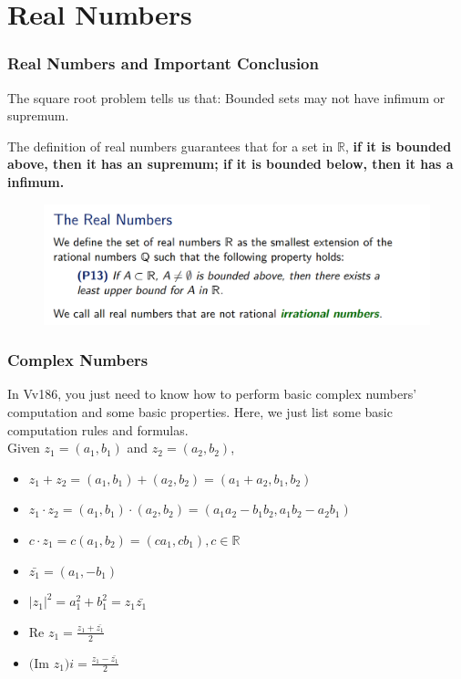 \documentclass{beamer}
\begin{document}
\section{Real Numbers}
\begin{frame}
    \frametitle{Real Numbers and Important Conclusion}
    The square root problem tells us that: Bounded sets may not have infimum or supremum.

    The definition of real numbers guarantees that for a set in $\mathbb{R}$, \textbf{if it is bounded above, then it has an supremum;
        if it is bounded below, then it has a infimum.}

    \begin{figure}[htbp]
        \centering
        \includegraphics[width=12cm]{definition.png}
    \end{figure}
\end{frame}


\begin{frame}
    \frametitle{Complex Numbers}
    \hspace{1em}
    In Vv186, you just need to know how to perform basic complex numbers' computation
    and some basic properties.
    Here, we just list some basic computation rules and formulas.\\
    Given $z_1=(a_1,b_1)$ and $z_2=(a_2,b_2)$,
    \begin{itemize}
        \item $z_1+z_2=(a_1,b_1)+(a_2,b_2)=(a_1+a_2,b_1,b_2)$
        \item $z_1\cdot z_2=(a_1,b_1)\cdot (a_2,b_2)=(a_1a_2-b_1b_2,a_1b_2-a_2b_1)$
        \item $c\cdot z_1=c(a_1,b_2)=(ca_1,cb_1), c\in \mathbb{R} $
        \item $\bar{z_1}=(a_1,-b_1)$
        \item $|z_1|^2=a_1^2+b_1^2=z_1\bar{z_1}$
        \item Re $z_1= \frac{z_1+\bar{z_1}}{2}$
        \item $($Im $z_1 )i= \frac{z_1-\bar{z_1}}{2}$
    \end{itemize}
\end{frame}
\end{document}
